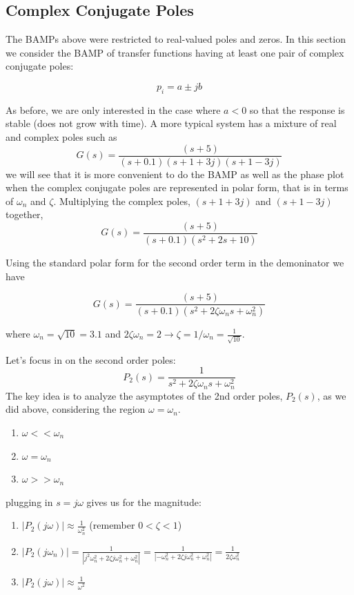 \subsection{Complex Conjugate Poles}

The BAMPs above were restricted to real-valued poles and zeros.  In this section we consider the BAMP of transfer functions having at least one pair of complex conjugate poles:

\[
p_i = a \pm jb
\]

As before, we are only interested in the case where $a<0$ so that the response is stable (does not grow with time).  A more typical system has a mixture of real and complex poles such as
\[
G(s) =  \frac {(s+5)} {(s+0.1)(s+1+3j)(s+1-3j)}
\]
we will see that it is more convenient to do the BAMP as well as the phase plot when the complex conjugate poles are represented in polar form, that is in terms of $\omega_n$ and $\zeta$.  Multiplying the complex poles,
$(s+1+3j)$ and $(s+1-3j)$ together,
\[
G(s) = \frac  {(s+5)}  {(s+0.1) (s^2 + 2s + 10 )  }
\]

Using the standard polar form for the second order term in the demoninator we have

\[
G(s) = \frac  {(s+5)}  {(s+0.1) (s^2 + 2\zeta\omega_n s + \omega_n^2)}
\]

where $\omega_n = \sqrt{10} = 3.1$ and $2\zeta\omega_n = 2 \to \zeta = 1/\omega_n = \frac{1}{\sqrt{10}} $.

Let's focus in on the second order poles:
\[
P_2(s) =   \frac {1}{s^2 + 2\zeta\omega_n s + \omega_n^2 }
\]
The key idea is to analyze the asymptotes of the 2nd order poles, $P_2(s)$, as we did above,  considering the region $\omega = \omega_n$.

\begin{enumerate}
  \item $\omega << \omega_n$
  \item $\omega =  \omega_n$
  \item $\omega >> \omega_n$
\end{enumerate}

plugging in $s=j\omega$  gives us for the magnitude:

\begin{enumerate}
  \item $|P_2(j\omega)| \approx \frac {1}{\omega_n^2}$ (remember $0< \zeta < 1$)
  \item $|P_2(j\omega_n)| = \frac  {1}{|j^2\omega_n^2 + 2\zeta j \omega_n^2 + \omega_n^2|}  = 
                               \frac{1}{|-\omega_n^2 + 2\zeta j \omega_n^2 + \omega_n^2|} =
                               \frac{1}{2\zeta \omega_n^2}$
  \item $|P_2(j\omega)| \approx \frac {1}{\omega^2}$
\end{enumerate}

